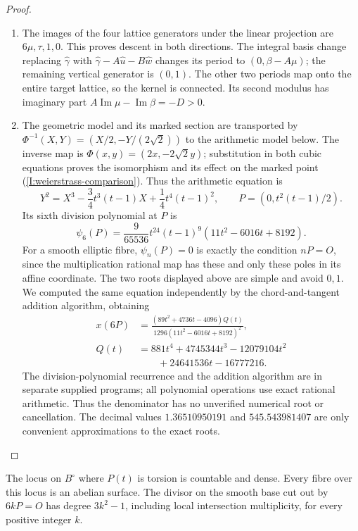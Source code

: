 \begin{proof}
\begin{enumerate}[label=\arabic*.,leftmargin=*]
\item The images of the four lattice generators under the linear projection
are \(6\mu,\tau,1,0\). This proves descent in both directions.
The integral basis change replacing \(\widehat\gamma\) with
\(\widehat\gamma-A\widehat u-B\widehat w\) changes its period to
\((0,\beta-A\mu)\); the remaining vertical generator is \((0,1)\).
The other two periods map onto the entire target lattice, so the kernel
is connected. Its second modulus has imaginary part
\(A\operatorname{Im}\mu-\operatorname{Im}\beta=-D>0\).

\item The geometric model and its marked section are transported by
$\Phi^{-1}(X,Y)=(X/2,-Y/(2\sqrt2))$ to the arithmetic model
below. The inverse map is
$\Phi(x,y)=(2x,-2\sqrt2y)$; substitution in both cubic
equations proves the isomorphism and its effect on the marked point
(\cref{I:weierstrass-comparison}). Thus the arithmetic equation is
\[
 Y^2=X^3-\frac34t^3(t-1)X+\frac14t^4(t-1)^2,
 \qquad P=(0,t^2(t-1)/2).
\]
Its sixth division polynomial at \(P\) is
\[
 \psi_6(P)=\frac9{65536}t^{24}(t-1)^9
 (11t^2-6016t+8192).
\]
For a smooth elliptic fibre, \(\psi_n(P)=0\) is exactly the condition
\(nP=O\), since the multiplication rational map has these and only these
poles in its affine coordinate. The two roots displayed above are simple
and avoid \(0,1\). We computed the same equation independently by the
chord-and-tangent addition algorithm, obtaining
\[
 \begin{aligned}
 x(6P)&=\frac{(89t^2+4736t-4096)Q(t)}
 {1296(11t^2-6016t+8192)^2},\\
 Q(t)&=881t^4+4745344t^3-12079104t^2\\
 &\hspace{2em}+24641536t-16777216.
 \end{aligned}
\]
The division-polynomial recurrence and the addition algorithm are in
separate supplied programs; all polynomial operations use exact rational
arithmetic. Thus the denominator has no unverified numerical root or
cancellation. The decimal values \(1.36510950191\) and
\(545.543981407\) are only convenient approximations to the exact roots.
\end{enumerate}
\end{proof}

\begin{proposition}\hypertarget{tag-01QS}{}\label{fam:src:D.1.2}\label{fam:st:D.1.2}

The locus on \(B^\circ\) where \(P(t)\) is torsion is countable and dense.
Every fibre over this locus is an abelian surface. The divisor on the
smooth base cut out by \(6kP=O\) has degree \(3k^2-1\), including local
intersection multiplicity, for every positive integer \(k\).
\end{proposition}

